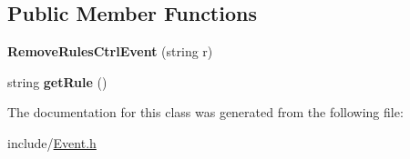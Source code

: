 \subsection*{Public Member Functions}
\begin{DoxyCompactItemize}
\item 
\mbox{\label{classRemoveRulesCtrlEvent_af97b2d469ae77d2af2accb3765fd8695}} 
{\bfseries Remove\+Rules\+Ctrl\+Event} (string r)
\item 
\mbox{\label{classRemoveRulesCtrlEvent_a0dfe839aad138da6212fb2f71add66f0}} 
string {\bfseries get\+Rule} ()
\end{DoxyCompactItemize}


The documentation for this class was generated from the following file\+:\begin{DoxyCompactItemize}
\item 
include/\hyperlink{Event_8h}{Event.\+h}\end{DoxyCompactItemize}
